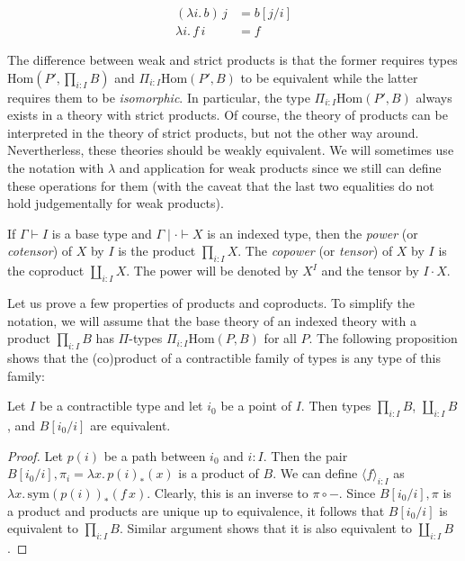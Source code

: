 \documentclass[reqno]{amsart}
\theoremstyle{definition}
\theoremstyle{remark}
\newcommand{\type}{}
\newcommand{\fs}[1]{\mathrm{#1}}
\newcommand{\Hom}{\fs{Hom}}
\newcommand{\sym}{\fs{sym}}
\numberwithin{figure}{section}
\begin{document}
\begin{align*}
(\lambda i.\,b)\,j & = b[j/i] \\
\lambda i.\,f\,i & = f
\end{align*}

The difference between weak and strict products is that the former requires types $\Hom(P',\prod_{i : I} B)$ and $\Pi_{i : I} \Hom(P',B)$ to be equivalent while the latter requires them to be \emph{isomorphic}.
In particular, the type $\Pi_{i : I} \Hom(P',B)$ always exists in a theory with strict products.
Of course, the theory of products can be interpreted in the theory of strict products, but not the other way around.
Nevertherless, these theories should be weakly equivalent.
We will sometimes use the notation with $\lambda$ and application for weak products since we still can define these operations for them (with the caveat that the last two equalities do not hold judgementally for weak products).

\begin{example}
If $\Gamma \vdash I \type$ is a base type and $\Gamma \mid \cdot \vdash X \type$ is an indexed type, then the \emph{power} (or \emph{cotensor}) of $X$ by $I$ is the product $\prod_{i : I} X$.
The \emph{copower} (or \emph{tensor}) of $X$ by $I$ is the coproduct $\coprod_{i : I} X$.
The power will be denoted by $X^I$ and the tensor by $I \cdot X$.
\end{example}

Let us prove a few properties of products and coproducts.
To simplify the notation, we will assume that the base theory of an indexed theory with a product $\prod_{i : I} B$ has $\Pi$-types $\Pi_{i : I} \Hom(P,B)$ for all $P$.
The following proposition shows that the (co)product of a contractible family of types is any type of this family:

\begin{prop}
Let $I$ be a contractible type and let $i_0$ be a point of $I$.
Then types $\prod_{i : I} B$, $\coprod_{i : I} B$, and $B[i_0/i]$ are equivalent.
\end{prop}
\begin{proof}
Let $p(i)$ be a path between $i_0$ and $i : I$.
Then the pair $B[i_0/i], \pi_i = \lambda x.\,p(i)_*(x)$ is a product of $B$.
We can define $\langle f \rangle_{i : I}$ as $\lambda x.\,\sym(p(i))_*(f\,x)$.
Clearly, this is an inverse to $\pi \circ -$.
Since $B[i_0/i],\pi$ is a product and products are unique up to equivalence, it follows that $B[i_0/i]$ is equivalent to $\prod_{i : I} B$.
Similar argument shows that it is also equivalent to $\coprod_{i : I} B$.
\end{proof}
\end{document}

